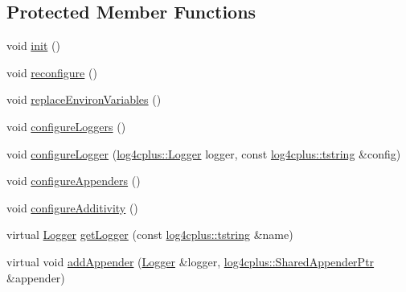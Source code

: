 \subsection*{Protected Member Functions}
\begin{DoxyCompactItemize}
\item 
void \hyperlink{classlog4cplus_1_1PropertyConfigurator_ad3d500c1e7d307481233046fb199f29f}{init} ()
\item 
void \hyperlink{classlog4cplus_1_1PropertyConfigurator_a6dc6d38274b51e9a03cf7e93952b1f3d}{reconfigure} ()
\item 
void \hyperlink{classlog4cplus_1_1PropertyConfigurator_a35894c378d953afb0228eee9a6cec189}{replace\-Environ\-Variables} ()
\item 
void \hyperlink{classlog4cplus_1_1PropertyConfigurator_a4262d4cb486501ef5afe57cd4df61d23}{configure\-Loggers} ()
\item 
void \hyperlink{classlog4cplus_1_1PropertyConfigurator_ad0156614ac22226f2c1ce3905e0954c3}{configure\-Logger} (\hyperlink{classlog4cplus_1_1Logger}{log4cplus\-::\-Logger} logger, const \hyperlink{namespacelog4cplus_a3c9287f6ebcddc50355e29d71152117b}{log4cplus\-::tstring} \&config)
\item 
void \hyperlink{classlog4cplus_1_1PropertyConfigurator_aa679a0313c42e73d7801f2db1c6ef129}{configure\-Appenders} ()
\item 
void \hyperlink{classlog4cplus_1_1PropertyConfigurator_a08a9514177abf1a49e16e2dc633a5404}{configure\-Additivity} ()
\item 
virtual \hyperlink{classlog4cplus_1_1Logger}{Logger} \hyperlink{classlog4cplus_1_1PropertyConfigurator_a75c31dce031d7a97804fdc572fdca97d}{get\-Logger} (const \hyperlink{namespacelog4cplus_a3c9287f6ebcddc50355e29d71152117b}{log4cplus\-::tstring} \&name)
\item 
virtual void \hyperlink{classlog4cplus_1_1PropertyConfigurator_af84ee25f2a52beddc37d2c08076b5741}{add\-Appender} (\hyperlink{classlog4cplus_1_1Logger}{Logger} \&logger, \hyperlink{namespacelog4cplus_a12d841b842c72396be9219ce67a0c215}{log4cplus\-::\-Shared\-Appender\-Ptr} \&appender)
\end{DoxyCompactItemize}
